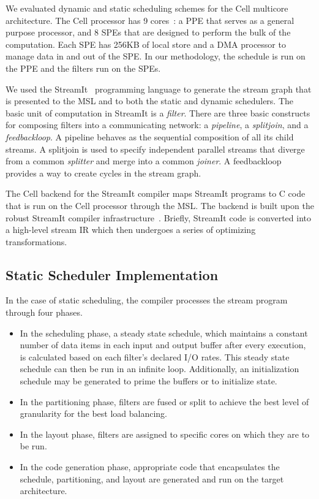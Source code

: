 We evaluated dynamic and static scheduling schemes for the Cell
multicore architecture. The Cell processor has 9
cores~\cite{Cell-hpca}: a PPE that serves as a general purpose
processor, and 8 SPEs that are designed to perform the bulk of the
computation. Each SPE has 256KB of local store and a DMA processor to
manage data in and out of the SPE. In our methodology, the schedule is
run on the PPE and the filters run on the SPEs.

We used the StreamIt~\cite{streamitweb} programming language to
generate the stream graph that is presented to the MSL and to both the
static and dynamic schedulers. The basic unit of computation in StreamIt is a 
{\it filter}. There are three basic constructs for composing filters
into a communicating network: a {\it pipeline}, a {\it splitjoin}, and
a {\it feedbackloop}. A pipeline behaves as the sequential composition
of all its child streams. A splitjoin is used to specify independent
parallel streams that diverge from a common {\it splitter} and merge
into a common {\it joiner}. A feedbackloop provides a way to create
cycles in the stream graph.

The Cell backend for the StreamIt compiler maps StreamIt programs to C code that
is run on the Cell processor through the MSL. The backend 
is built upon the robust StreamIt compiler infrastructure~\cite{asplos06}. 
Briefly, StreamIt code is converted into a
high-level stream IR which then undergoes a series of optimizing transformations.


\subsection{Static Scheduler Implementation}
In the case of static scheduling, the compiler processes the stream program
through four phases.
\begin{itemize}
\item In the scheduling phase, a steady state schedule, which maintains a constant
number of data items in each input and output buffer after every execution, is calculated based on each
filter's declared I/O rates. This steady state schedule can then
be run in an infinite loop. Additionally, an initialization schedule may be
generated to prime the buffers or to initialize state.
\item In the partitioning phase, filters are fused or
split to achieve the best level of granularity for the best load balancing.
\item In the layout phase, filters are assigned to specific cores on which
they are to be run.
\item In the code generation phase, appropriate code that encapsulates the schedule,
partitioning, and layout are generated and run on the target architecture.
\end{itemize}

